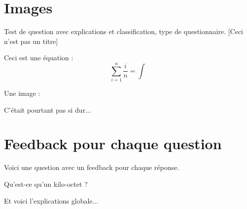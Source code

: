 \documentclass[12pt,a4paper]{article}
\begin{document}
\section{Images}

\begin{question}
\qoneline

Test de question avec explications et classification, type de questionnaire. [Ceci n'est pas un titre]

Ceci est une équation :
$$\sum_{i=1}^n \frac{i}{n}=\int$$

Une image : 



\begin{answers}

\end{answers}

\begin{explanations}
C'était pourtant pas si dur...
\end{explanations}

\end{question}

\section{Feedback pour chaque question}

\begin{question}

Voici une question avec un feedback pour chaque réponse.

Qu'est-ce qu'un kilo-octet ?


\begin{answers}
	

\end{answers}

\begin{explanations}
Et voici l'explications globale...
\end{explanations}

\end{question}
\end{document}
